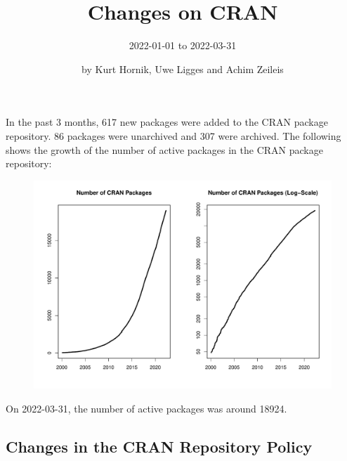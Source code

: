 \title{Changes on CRAN}
\subtitle{2022-01-01 to 2022-03-31}
\author{by Kurt Hornik, Uwe Ligges and Achim Zeileis}
\maketitle

\sloppy


In the past 3 months, 617 new packages were added to the CRAN package
repository.  86 packages were unarchived and 307 were archived.  The
following shows the growth of the number of active packages in the CRAN
package repository:

\begin{figure}[h]
  \centering
  \includegraphics[width=5in]{cran_growth}
\end{figure}

\noindent
On 2022-03-31, the number of active packages was around 18924.

\subsection{Changes in the CRAN Repository Policy}


